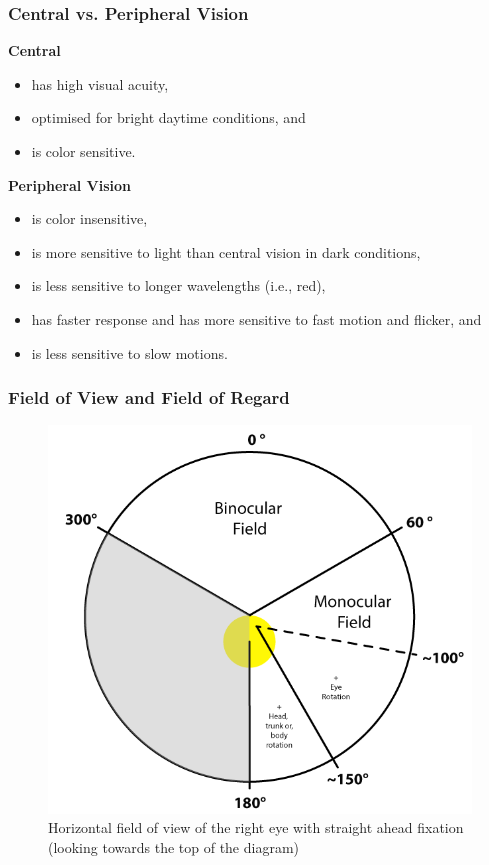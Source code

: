 \begin{frame}
	\frametitle{Central vs. Peripheral Vision}
	\textbf{Central}
	\begin{itemize}
		\item has high visual acuity,
		\item optimised for bright daytime conditions, and
		\item is color sensitive.
	\end{itemize}
	
	\textbf{Peripheral Vision}
	\begin{itemize}
		\item is color insensitive, 
		\item is more sensitive to light than central vision in dark conditions,
		\item is less sensitive to longer wavelengths (i.e., red),
		\item has faster response and has more sensitive to fast motion and flicker, and
		\item is less sensitive to slow motions.
	\end{itemize}
\end{frame}

\begin{frame}
	\frametitle{Field of View and Field of Regard}
	\begin{figure}
		\includegraphics[scale=.3]{assets/fov} 
		\caption{Horizontal field of view of the right eye with straight ahead fixation (looking towards the top of the diagram)}
	\end{figure}
\end{frame}


